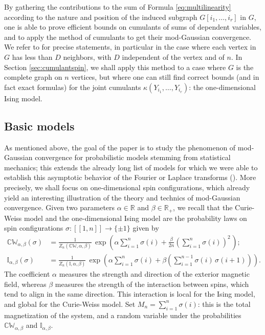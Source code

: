 \documentclass[12pt,a4paper,reqno]{amsart}
\newcommand{\R}{\mathbb{R}}
\newcommand{\CW}{\mathbb{C}\mathbb{W}}
\newcommand{\IS}{\mathbb{I}}
\newcommand{\lle}{\left[\!\left[}
\newcommand{\rre}{\right]\!\right]}
\theoremstyle{remark}
\begin{document}
By gathering the contributions to the sum of Formula \eqref{eq:multilinearity} according to the nature and position of the induced subgraph $G[i_1,\ldots,i_r]$ in $G$, one is able to prove efficient bounds on cumulants of sums of dependent variables, and to apply the method of cumulants to get their mod-Gaussian convergence. We refer to \cite{FMN13} for precise statements, in particular in the case where each vertex in $G$ has less than $D$ neighbors, with $D$ independent of the vertex and of $n$. In Section \ref{sec:cumulantspin}, we shall apply this method to a case where $G$ is the complete graph on $n$ vertices, but where one can still find correct bounds (and in fact exact formulas) for the joint cumulants $\kappa(Y_{i_1},\ldots,Y_{i_r})$: the one-dimensional Ising model.
\medskip



\subsection{Basic models}
 As mentioned above, the goal of the paper is to study the phenomenon of mod-Gaussian convergence for probabilistic models stemming from statistical mechanics; this extends the already long list of models for which we were able to establish this asymptotic behavior of the Fourier or Laplace transforms (\cite{JKN11,KN12,FMN13}). More precisely, we shall focus on one-dimensional spin configurations, which already yield an interesting illustration of the theory and technics of mod-Gaussian convergence. Given two parameters $\alpha \in \R$ and $\beta \in \R_+$, we recall that the Curie-Weiss model and the one-dimensional Ising model are the probability laws on spin configurations $\sigma : \lle 1,n\rre \to \{\pm 1\}$ given by
\begin{align}
\CW_{\alpha,\beta}(\sigma) &= \frac{1}{Z_n(\CW,\alpha,\beta)}\,\exp\left(\alpha \sum_{i=1}^n \sigma(i)+\frac{\beta}{2n} \left(\sum_{i=1}^n \sigma(i)\right)^{\!\!2\,}\right);\label{eq:curiemeasure}\\
\IS_{\alpha,\beta}(\sigma) &= \frac{1}{Z_n(\IS,\alpha,\beta)}\,\exp\left(\alpha \sum_{i=1}^n \sigma(i)+\beta \left(\sum_{i=1}^{n-1} \sigma(i)\,\sigma(i+1)\right)\right).\label{eq:isingmeasure}
\end{align}
The coefficient $\alpha$ measures the strength and direction of the exterior magnetic field, whereas $\beta$ measures the strength of the interaction between spins, which tend to align in the same direction. This interaction is local for the Ising model, and global for the Curie-Weiss model. Set $M_n=\sum_{i=1}^n \sigma(i)$: this is the total magnetization of the system, and a random variable under the probabilities $\CW_{\alpha,\beta}$ and $\IS_{\alpha,\beta}$.\bigskip
\end{document}
